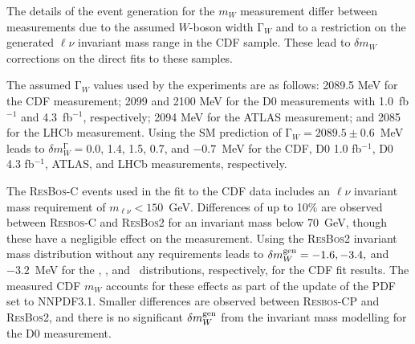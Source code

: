 
The details of the event generation for the $m_W$ measurement differ between measurements due to 
the assumed $W$-boson width ${\mathrm \Gamma}_W$ and to a restriction on the generated $\ell\nu$ invariant 
mass range in the CDF sample.  These lead to $\delta m_W$ corrections on the direct fits to these 
samples.  

The assumed ${\mathrm \Gamma}_W$ values used by the experiments are as follows: 2089.5 MeV for the CDF 
measurement; 2099 and 2100 MeV for the D0 measurements with 1.0~fb$^{-1}$ and 4.3~fb$^{-1}$, 
respectively; 2094 MeV for the ATLAS measurement; and 2085 for the LHCb measurement.  Using the  
SM prediction of ${\mathrm \Gamma}_W = 2089.5 \pm 0.6$~MeV leads to $\delta m_W^{\mathrm \Gamma}=0.0$, 1.4,
1.5, 0.7, and $-0.7$~MeV for the CDF, D0 1.0 fb$^{-1}$, D0 4.3 fb$^{-1}$, ATLAS, and LHCb measurements,
respectively.

The {\textsc{ResBos-C}} events used in the fit to the CDF data includes an $\ell\nu$ invariant mass 
requirement of $m_{\ell\nu}<150$~GeV.  Differences of up to 10\% are observed between {\textsc{Resbos-C}} 
and {\textsc{ResBos2}} for an invariant mass below 70~GeV, though these have a negligible effect on the 
measurement.  Using the {\textsc{ResBos2}} invariant mass distribution without any requirements leads 
to $\delta m_W^{\scriptsize\textrm{gen}} = -1.6, -3.4,$ and $-3.2$~MeV for the \mT, \pTl, and \met~distributions,
respectively, for the CDF fit results.  The measured CDF $m_W$ accounts for these effects as part of the update
of the PDF set to NNPDF3.1.  Smaller differences are observed between {\textsc{Resbos-CP}} and {\textsc{ResBos2}}, 
and there is no significant $\delta m_W^{\scriptsize\textrm{gen}}$ from the invariant mass modelling for the D0
measurement.
